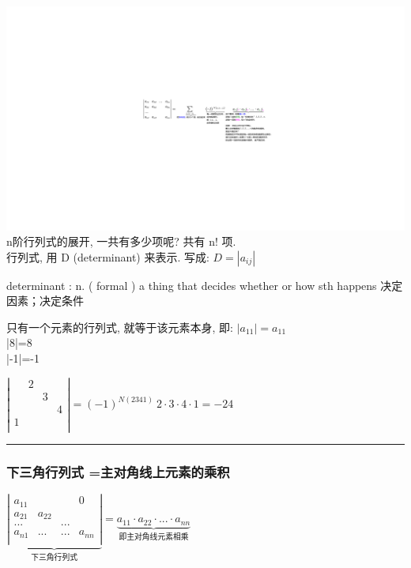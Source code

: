 \documentclass[UTF8]{ctexart}
\begin{document}
	\includegraphics[width=1\textwidth]{img/0003.pdf}\\
	
	n阶行列式的展开, 一共有多少项呢? 共有 n! 项. \\
	
	行列式, 用 D (determinant) 来表示. 写成: $	D=\left| a_{ij} \right|	$
	
	\begin{myEnvSample}
	determinant : n. ( formal ) a thing that decides whether or how sth happens 决定因素；决定条件
	\end{myEnvSample}

	只有一个元素的行列式, 就等于该元素本身, 即:	$	\left| a_{11} \right|=a_{11}	$\\
	|8|=8\\
	|-1|=-1\\
	
	\begin{myEnvSample}
$
\left| \begin{matrix}
	&		2&		&		\\
	&		&		3&		\\
	&		&		&		4\\
	1&		&		&		\\
\end{matrix} \right|=\left( -1 \right) ^{N\left( 2341 \right)}\ 2\cdot 3\cdot 4\cdot 1=-24
$
	\end{myEnvSample}
	


\hrule

	
\subsubsection{下三角行列式 =主对角线上元素的乘积}

$
\underset{\text{下三角行列式}}{\underbrace{\left| \begin{matrix}
			a_{11}&		&		&	0	\\
			a_{21}&		a_{22}&		&		\\
			...&		&		...&		\\
			a_{n1}&		...&		...&		a_{nn}\\
		\end{matrix} \right|}}=\underset{\text{即主对角线元素相乘}}{\underbrace{a_{11}\cdot a_{22}\cdot ...\cdot a_{nn}}}
$
\end{document}
